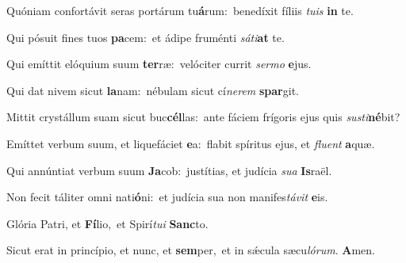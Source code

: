 \setcounter{versecount}{2}

\vs Quóniam confortávit seras portárum tu\textbf{á}rum:~\redgreheightstar benedíxit fíliis \textit{tu}\textit{is} \textbf{in} te.

\vs Qui pósuit fines tuos \textbf{pa}cem:~\redgreheightstar et ádipe fruménti \textit{sá}\textit{ti}\textbf{at} te.

\vs Qui emíttit elóquium suum \textbf{ter}ræ:~\redgreheightstar velóciter currit \textit{ser}\textit{mo} \textbf{e}jus.

\vs Qui dat nivem sicut \textbf{la}nam:~\redgreheightstar nébulam sicut cí\textit{ne}\textit{rem} \textbf{spar}git.

\vs Mittit crystállum suam sicut buc\textbf{cél}las:~\redgreheightstar ante fáciem frígoris ejus quis \textit{sus}\textit{ti}\textbf{né}bit?

\vs Emíttet verbum suum, et liquefáciet \textbf{e}a:~\redgreheightstar flabit spíritus ejus, et \textit{flu}\textit{ent} \textbf{a}quæ.

\vs Qui annúntiat verbum suum \textbf{Ja}cob:~\redgreheightstar justítias, et judícia \textit{su}\textit{a} \textbf{Is}raël.

\vs Non fecit táliter omni nati\textbf{ó}ni:~\redgreheightstar et judícia sua non manifes\textit{tá}\textit{vit} \textbf{e}is.

\vs Glória Patri, et \textbf{Fí}lio,~\redgreheightstar et Spirí\textit{tu}\textit{i} \textbf{Sanc}to.

\vs Sicut erat in princípio, et nunc, et \textbf{sem}per,~\redgreheightstar et in sǽcula sæcu\textit{ló}\textit{rum}. \textbf{A}men.

